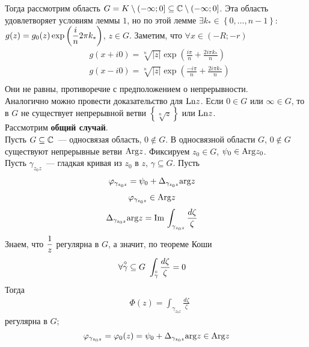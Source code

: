 Тогда рассмотрим область $G = K \setminus \left( -\infty;0 \right]\subseteq \mathbb{C}
\setminus \left( -\infty; 0 \right]$. Эта область удовлетворяет условиям леммы
$1$, но по этой лемме $\exists k_* \in \left\{ 0, \dots, n-1 \right\}$: $g(z) =
g_0(z)\exp \left( \displaystyle \frac{i}{n} 2 \pi k_* \right)$, $z \in G$. Заметим, что
$\forall x \in \left( -R;-r \right)$
\begin{align*}
& g(x+i0) = \sqrt[n]{\left| z \right|}\exp \left( \frac{i \pi}{n} + \frac{2 i \pi k_*}{n}\right) \\
& g(x-i0) = \sqrt[n]{\left| z \right|}\exp \left( \frac{-i \pi}{n} + \frac{2 i \pi k_*}{n}\right) \\
\end{align*}
Они не равны, противоречие с предположением о непрерывности.
\\
Аналогично можно провести доказательство для $\mathrm{Ln} z$.
\corollary
Если $0 \in G$ или $\infty \in G$, то в $G$ не существует непрерывной ветви
$\left\{ \sqrt[n]{z} \right\}$ или $\mathrm{Ln} z$.
\\
Рассмотрим \textbf{общий случай}.
\\
Пусть $G \subseteq \mathbb{C}$~--- односвязая область, $0 \not \in G$.
\lemma
В односвязной области $G$, $0 \not \in G$ существуют непрерывные ветви $\mathrm{Arg} z$.
\pr
Фиксируем $z_0 \in G$, $\psi_0 \in \mathrm{Arg} z_0$.
\\
Пусть $\gamma_{z_0z}$~--- гладкая кривая из $z_0$ в $z$, $ \gamma \subseteq G$.
Пусть
\begin{align*}
  & \varphi_{\gamma_{z_0z}} = \psi_0 + \Delta_{\gamma_{z_0z}}\mathrm{arg} z
\end{align*}
\begin{align*}
  & \varphi_{\gamma_{z_0z}} \in \mathrm{Arg} z
\end{align*}
\begin{align*}
  & \Delta_{\gamma_{z_0z}}\mathrm{arg} z = \mathrm{Im}\, \int_{\gamma_{z_0z}}\frac{d \zeta}{\zeta}
\end{align*}
Знаем, что $\displaystyle \frac{1}{z}$ регулярна в $G$, а значит, по теореме Коши
\begin{align*}
  & \forall \os{\circ}{\gamma} \subseteq G \ \int_{\os{\circ}{\gamma}}\frac{d\zeta}{\zeta} = 0
\end{align*}
Тогда
\begin{align*}
  & \Phi(z) = \int_{\gamma_{z_0z}}\frac{d \zeta}{\zeta}
\end{align*}
регулярна в $G$;
\begin{equation}\label{(15.9)}
    \varphi_{\gamma_{z_0z}} = \varphi_0(z) = \psi_0 + \Delta_{\gamma_{z_0z}}\mathrm{arg} z \in \mathrm{Arg} z
\end{equation}
